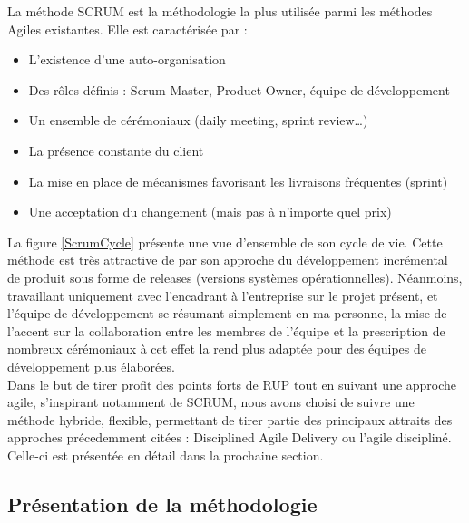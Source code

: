 \begin{spacing}{1.5}
 La méthode SCRUM est la méthodologie la plus utilisée parmi les méthodes Agiles existantes. Elle est caractérisée par :
\begin{itemize}
    \item L’existence d’une auto-organisation
    \item Des rôles définis : Scrum Master, Product Owner, équipe de développement
    \item Un ensemble de cérémoniaux (daily meeting, sprint review…)
    \item La présence constante du client
    \item La mise en place de mécanismes favorisant les livraisons fréquentes (sprint)
    \item Une acceptation du changement (mais pas à n’importe quel prix)
\end{itemize}
La figure \ref{ScrumCycle} présente une vue d'ensemble de son cycle de vie. Cette méthode est très attractive de par son approche du développement incrémental de produit sous forme de releases (versions systèmes opérationnelles). Néanmoins, travaillant uniquement avec l'encadrant à l'entreprise sur le projet présent, et l'équipe de développement se résumant simplement en ma personne, la mise de l'accent sur la collaboration entre les membres de l'équipe et la prescription de nombreux cérémoniaux à cet effet la rend plus adaptée pour des équipes de développement plus élaborées.
\   \\
Dans le but de tirer profit des points forts de RUP tout en suivant une approche agile, s'inspirant notamment de SCRUM, nous avons choisi de suivre une méthode hybride, flexible, permettant de tirer partie des principaux attraits des approches précedemment citées : Disciplined Agile Delivery ou l'agile discipliné. Celle-ci est présentée en détail dans la prochaine section.

\subsection{Présentation de la méthodologie}



\end{spacing}
